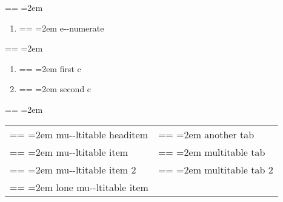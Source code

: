 \documentclass{book}
\makeatletter
\newenvironment{GNUTexinfopreformatted}{%
  \par\obeylines\obeyspaces\frenchspacing
  \parskip=\z@\parindent=\z@}{}
\makeatother
\begin{document}
\begin{GNUTexinfopreformatted}
\leftskip=2em\relax\ttfamily%

\end{GNUTexinfopreformatted}
\begin{enumerate}[label=\alph*.]
\item \begin{GNUTexinfopreformatted}
\leftskip=2em\relax\ttfamily%
e{-}{-}numerate
\end{GNUTexinfopreformatted}
\end{enumerate}
\begin{GNUTexinfopreformatted}
\leftskip=2em\relax\ttfamily%

\end{GNUTexinfopreformatted}
\begin{enumerate}[label=\alph*.,start=3]
\item \begin{GNUTexinfopreformatted}
\leftskip=2em\relax\ttfamily%
first c
\end{GNUTexinfopreformatted}
\item \begin{GNUTexinfopreformatted}
\leftskip=2em\relax\ttfamily%
second c
\end{GNUTexinfopreformatted}
\end{enumerate}
\begin{GNUTexinfopreformatted}
\leftskip=2em\relax\ttfamily%

\end{GNUTexinfopreformatted}
\begin{tabular}{m{} m{}}%
\begin{GNUTexinfopreformatted}
\leftskip=2em\relax\ttfamily%
mu{-}{-}ltitable headitem \end{GNUTexinfopreformatted}&
\begin{GNUTexinfopreformatted}
\leftskip=2em\relax\ttfamily%
another tab
\end{GNUTexinfopreformatted}\\
\begin{GNUTexinfopreformatted}
\leftskip=2em\relax\ttfamily%
mu{-}{-}ltitable item \end{GNUTexinfopreformatted}&
\begin{GNUTexinfopreformatted}
\leftskip=2em\relax\ttfamily%
multitable tab
\end{GNUTexinfopreformatted}\\
\begin{GNUTexinfopreformatted}
\leftskip=2em\relax\ttfamily%
mu{-}{-}ltitable item 2 \end{GNUTexinfopreformatted}&
\begin{GNUTexinfopreformatted}
\leftskip=2em\relax\ttfamily%
multitable tab 2
\index[cp]{index entry within multitable}%
\end{GNUTexinfopreformatted}\\
\begin{GNUTexinfopreformatted}
\leftskip=2em\relax\ttfamily%
lone mu{-}{-}ltitable item
\end{GNUTexinfopreformatted}&\\
\end{tabular}%
\end{document}
